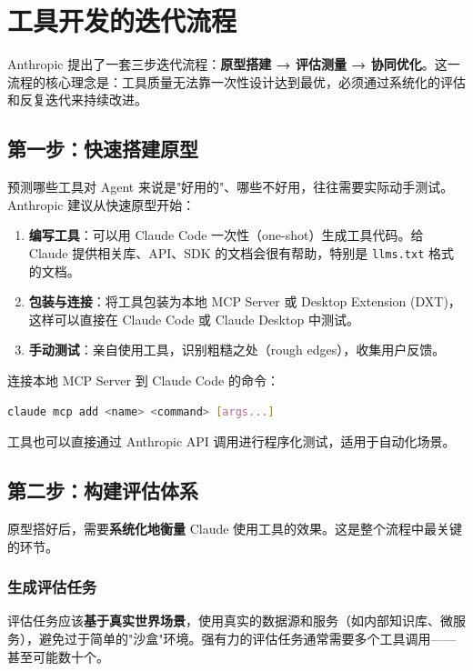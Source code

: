 \section{工具开发的迭代流程}

Anthropic 提出了一套三步迭代流程：\textbf{原型搭建 → 评估测量 → 协同优化}。这一流程的核心理念是：工具质量无法靠一次性设计达到最优，必须通过系统化的评估和反复迭代来持续改进。

\subsection{第一步：快速搭建原型}

预测哪些工具对 Agent 来说是"好用的"、哪些不好用，往往需要实际动手测试。Anthropic 建议从快速原型开始：

\begin{enumerate}[leftmargin=1.5em]
    \item \textbf{编写工具}：可以用 Claude Code 一次性（one-shot）生成工具代码。给 Claude 提供相关库、API、SDK 的文档会很有帮助，特别是 \texttt{llms.txt} 格式的文档。
    \item \textbf{包装与连接}：将工具包装为本地 MCP Server 或 Desktop Extension (DXT)，这样可以直接在 Claude Code 或 Claude Desktop 中测试。
    \item \textbf{手动测试}：亲自使用工具，识别粗糙之处（rough edges），收集用户反馈。
\end{enumerate}

连接本地 MCP Server 到 Claude Code 的命令：

\begin{lstlisting}[language=bash, caption={连接本地 MCP Server}]
claude mcp add <name> <command> [args...]
\end{lstlisting}

工具也可以直接通过 Anthropic API 调用进行程序化测试，适用于自动化场景。

\subsection{第二步：构建评估体系}

原型搭好后，需要\textbf{系统化地衡量} Claude 使用工具的效果。这是整个流程中最关键的环节。

\subsubsection{生成评估任务}

评估任务应该\textbf{基于真实世界场景}，使用真实的数据源和服务（如内部知识库、微服务），避免过于简单的"沙盒"环境。强有力的评估任务通常需要多个工具调用——甚至可能数十个。

